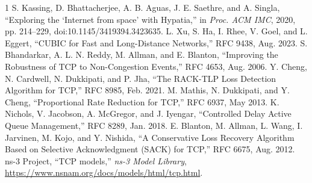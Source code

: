 \documentclass[conference]{IEEEtran}
\begin{document}
\begin{thebibliography}{1}
S. Kassing, D. Bhattacherjee, A. B. Aguas, J. E. Saethre, and A. Singla,
``Exploring the `Internet from space' with Hypatia,'' in \emph{Proc. ACM IMC},
2020, pp. 214--229, doi:10.1145/3419394.3423635.
L. Xu, S. Ha, I. Rhee, V. Goel, and L. Eggert,
``CUBIC for Fast and Long-Distance Networks,'' RFC 9438, Aug. 2023.
S. Bhandarkar, A. L. N. Reddy, M. Allman, and E. Blanton,
``Improving the Robustness of TCP to Non-Congestion Events,'' RFC 4653,
Aug. 2006.
Y. Cheng, N. Cardwell, N. Dukkipati, and P. Jha,
``The RACK-TLP Loss Detection Algorithm for TCP,'' RFC 8985, Feb. 2021.
M. Mathis, N. Dukkipati, and Y. Cheng,
``Proportional Rate Reduction for TCP,'' RFC 6937, May 2013.
K. Nichols, V. Jacobson, A. McGregor, and J. Iyengar,
``Controlled Delay Active Queue Management,'' RFC 8289, Jan. 2018.
E. Blanton, M. Allman, L. Wang, I. Jarvinen, M. Kojo, and Y. Nishida,
``A Conservative Loss Recovery Algorithm Based on Selective
Acknowledgment (SACK) for TCP,'' RFC 6675, Aug. 2012.
ns-3 Project, ``TCP models,'' \emph{ns-3 Model Library},
\url{https://www.nsnam.org/docs/models/html/tcp.html}.
\end{thebibliography}
\end{document}
